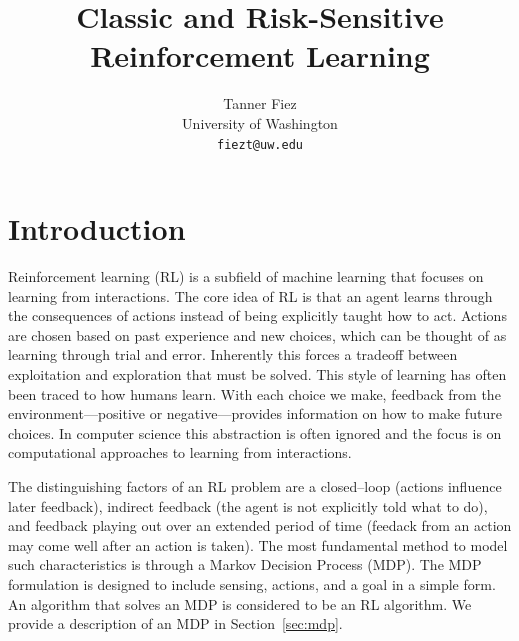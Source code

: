 \documentclass{article}
\title{Classic and Risk-Sensitive Reinforcement Learning}
\author{
  Tanner Fiez \\
  University of Washington \\
  \texttt{fiezt@uw.edu} \\
}
\begin{document}
\maketitle



\section{Introduction}
Reinforcement learning (RL) is a subfield of machine learning that focuses on learning from interactions. The core idea of RL is that an agent learns through the consequences of actions instead of being explicitly taught how to act. Actions are chosen based on past experience and new choices, which can be thought of as learning through trial and error. Inherently this forces a tradeoff between exploitation and exploration that must be solved. This style of learning has often been traced to how humans learn. With each choice we make, feedback from the environment---positive or negative---provides information on how to make future choices. In computer science this abstraction is often ignored and the focus is on computational approaches to learning from interactions. 

The distinguishing factors of an RL problem are a closed--loop (actions influence later feedback), indirect feedback (the agent is not explicitly told what to do), and feedback playing out over an extended period of time (feedack from an action may come well after an action is taken). The most fundamental method to model such characteristics is through a Markov Decision Process (MDP). The MDP formulation is designed to include sensing, actions, and a goal in a simple form. An algorithm that solves an MDP is considered to be an RL algorithm. We provide a description of an MDP in Section~\ref{sec:mdp}.
\end{document}
